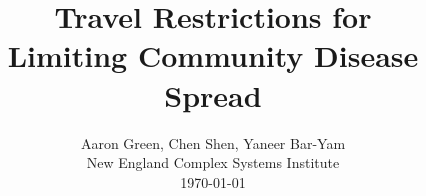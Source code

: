 \documentclass[onecolumn,journal]{IEEEtran}
\begin{document}
\title{\color{Brown} Travel Restrictions for\\Limiting Community Disease Spread \\
\vspace{-0.35ex}}
\author{Aaron Green, Chen Shen, Yaneer Bar-Yam \\ New England Complex Systems Institute \\
 \today 
  \vspace{-14ex} \\ 

   
\bigskip
\bigskip

\textbf{}
 }
    
\maketitle


\flushbottom %



\thispagestyle{empty} %




\renewcommand{\thefootnote}{\fnsymbol{footnote}}
\end{document}
